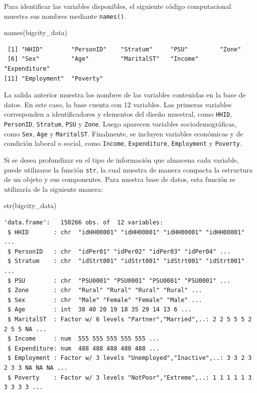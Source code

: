 \documentclass[
  spanish,
  11pt,
  letterpaper,
  oneside,
  open=any]{scrbook}
\newenvironment{Shaded}{\begin{snugshade}}{\end{snugshade}}
\newcommand{\FunctionTok}[1]{\textcolor[rgb]{0.28,0.35,0.67}{#1}}
\newcommand{\NormalTok}[1]{\textcolor[rgb]{0.00,0.23,0.31}{#1}}
\begin{document}
Para identificar las variables disponibles, el siguiente código
computacional muestra sus nombres mediante \texttt{names()}.

\begin{Shaded}
\begin{Highlighting}[]
\FunctionTok{names}\NormalTok{(bigcity\_data)}
\end{Highlighting}
\end{Shaded}

\begin{verbatim}
 [1] "HHID"        "PersonID"    "Stratum"     "PSU"         "Zone"       
 [6] "Sex"         "Age"         "MaritalST"   "Income"      "Expenditure"
[11] "Employment"  "Poverty"    
\end{verbatim}

La salida anterior muestra los nombres de las variables contenidas en la
base de datos. En este caso, la base cuenta con 12 variables. Las
primeras variables corresponden a identificadores y elementos del diseño
muestral, como \texttt{HHID}, \texttt{PersonID}, \texttt{Stratum},
\texttt{PSU} y \texttt{Zone}. Luego aparecen variables
sociodemográficas, como \texttt{Sex}, \texttt{Age} y \texttt{MaritalST}.
Finalmente, se incluyen variables económicas y de condición laboral o
social, como \texttt{Income}, \texttt{Expenditure}, \texttt{Employment}
y \texttt{Poverty}.

Si se desea profundizar en el tipo de información que almacena cada
variable, puede utilizarse la función \texttt{str}, la cual muestra de
manera compacta la estructura de un objeto y sus componentes. Para
nuestra base de datos, esta función se utilizaría de la siguiente
manera:

\begin{Shaded}
\begin{Highlighting}[]
\FunctionTok{str}\NormalTok{(bigcity\_data)}
\end{Highlighting}
\end{Shaded}

\begin{verbatim}
'data.frame':   150266 obs. of  12 variables:
 $ HHID       : chr  "idHH00001" "idHH00001" "idHH00001" "idHH00001" ...
 $ PersonID   : chr  "idPer01" "idPer02" "idPer03" "idPer04" ...
 $ Stratum    : chr  "idStrt001" "idStrt001" "idStrt001" "idStrt001" ...
 $ PSU        : chr  "PSU0001" "PSU0001" "PSU0001" "PSU0001" ...
 $ Zone       : chr  "Rural" "Rural" "Rural" "Rural" ...
 $ Sex        : chr  "Male" "Female" "Female" "Male" ...
 $ Age        : int  38 40 20 19 18 35 29 14 13 6 ...
 $ MaritalST  : Factor w/ 6 levels "Partner","Married",..: 2 2 5 5 5 2 2 5 5 NA ...
 $ Income     : num  555 555 555 555 555 ...
 $ Expenditure: num  488 488 488 488 488 ...
 $ Employment : Factor w/ 3 levels "Unemployed","Inactive",..: 3 3 2 3 2 3 3 NA NA NA ...
 $ Poverty    : Factor w/ 3 levels "NotPoor","Extreme",..: 1 1 1 1 1 3 3 3 3 3 ...
\end{verbatim}
\end{document}
